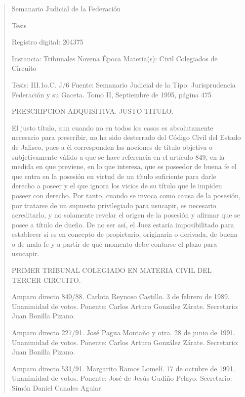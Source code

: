 \documentclass[11pt,a4paper]{article}
\begin{document}
\begin{quote}
                                                   Semanario Judicial de la Federación

                                                  Tesis

 Registro digital: 204375

 Instancia: Tribunales             Novena Época                          Materia(s): Civil
 Colegiados de Circuito

 Tesis: III.1o.C. J/6              Fuente: Semanario Judicial de la      Tipo: Jurisprudencia
                                   Federación y su Gaceta.
                                   Tomo II, Septiembre de 1995,
                                   página 475


PRESCRIPCION ADQUISITIVA. JUSTO TITULO.


El justo título, aun cuando no en todos los casos es absolutamente necesario para prescribir, no ha
sido desterrado del Código Civil del Estado de Jalisco, pues a él corresponden las nociones de título
objetiva o subjetivamente válido a que se hace referencia en el artículo 849, en la medida en que
previene, en lo que interesa, que es poseedor de buena fe el que entra en la posesión en virtud de
un título suficiente para darle derecho a poseer y el que ignora los vicios de su título que le impiden
poseer con derecho. Por tanto, cuando se invoca como causa de la posesión, por tratarse de un
supuesto privilegiado para usucapir, es necesario acreditarlo, y no solamente revelar el origen de la
posesión y afirmar que se posee a título de dueño. De no ser así, el Juez estaría imposibilitado para
establecer si es en concepto de propietario, originaria o derivada, de buena o de mala fe y a partir
de qué momento debe contarse el plazo para usucapir.

PRIMER TRIBUNAL COLEGIADO EN MATERIA CIVIL DEL TERCER CIRCUITO.


Amparo directo 840/88. Carlota Reynoso Castillo. 3 de febrero de 1989. Unanimidad de votos.
Ponente: Carlos Arturo González Zárate. Secretario: Juan Bonilla Pizano.

Amparo directo 227/91. José Pagua Montaño y otra. 28 de junio de 1991. Unanimidad de votos.
Ponente: Carlos Arturo González Zárate. Secretario: Juan Bonilla Pizano.

Amparo directo 531/91. Margarito Ramos Lomelí. 17 de octubre de 1991. Unanimidad de votos.
Ponente: José de Jesús Gudiño Pelayo. Secretario: Simón Daniel Canales Aguiar.


\end{quote}
\end{document}
